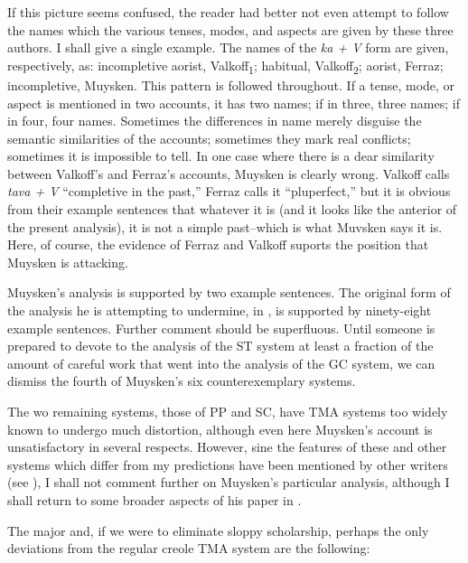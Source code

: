 If this picture seems confused, the reader had better not even attempt to follow the names which the various tenses, modes, and aspects are given by these three authors. I shall give a single example. The names of the \textit{ka + V} form are given, respectively, as: incompletive aorist, Valkoff\textsubscript{1}; habitual, Valkoff\textsubscript{2}; aorist, Ferraz; incompletive, Muysken. This pattern is followed throughout. If a tense, mode, or aspect is mentioned in two accounts, it has two names; if in three, three names; if in four, four names. Sometimes the differences in name merely disguise the semantic similarities of the accounts; sometimes they mark real conflicts; sometimes it is impossible to tell. In one case where there is a dear similarity between Valkoff's and Ferraz's accounts, Muysken is clearly wrong. Valkoff calls \textit{tava + V} ``completive
in the past,'' Ferraz calls it ``pluperfect,'' but it is obvious from their example sentences that whatever it is (and it looks like the anterior of the present analysis), it is not a simple past--which is what Muvsken says it is. Here, of course, the evidence of Ferraz and Valkoff suports the position that Muysken is attacking.

Muysken's analysis is supported by two example sentences. The original form of the analysis he is attempting to undermine, in \citet[Chapter~2]{Bickerton1975}, is supported by ninety-eight example sentences. Further comment should be superfluous. Until someone is prepared to devote to the analysis of the ST system at least a fraction of the amount of careful work that went into the analysis of the GC system, we can dismiss the fourth of Muysken's six counterexemplary systems.

The wo remaining systems, those of PP and SC, have TMA sys\-tems too widely known to undergo much distortion, although even here Muysken's account is unsatisfactory in several respects. However, sine the features of these and other systems which differ from my predictions have been mentioned by other writers (see \citealt{Hill1979}), I shall not comment further on Muysken's particular analysis, although I shall return to some broader aspects of his paper in .

The major and, if we were to eliminate sloppy scholarship, perhaps the only deviations from the regular creole TMA system are the following:


